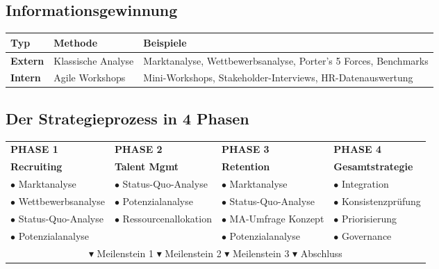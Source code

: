 \documentclass[11pt,a4paper]{article}
\begin{document}
\subsection{Informationsgewinnung}

\begin{table}[h]
\centering
\begin{tabular}{lll}
\toprule
\textbf{Typ} & \textbf{Methode} & \textbf{Beispiele} \\
\midrule
\textbf{Extern} & Klassische Analyse & Marktanalyse, Wettbewerbsanalyse, Porter's 5 Forces, Benchmarks \\
\textbf{Intern} & Agile Workshops & Mini-Workshops, Stakeholder-Interviews, HR-Datenauswertung \\
\bottomrule
\end{tabular}
\end{table}

\subsection{Der Strategieprozess in 4 Phasen}

\begin{table}[h]
\centering
\small
\begin{tabular}{p{3.2cm}p{3.2cm}p{3.2cm}p{3.2cm}}
\toprule
\textbf{PHASE 1} & \textbf{PHASE 2} & \textbf{PHASE 3} & \textbf{PHASE 4} \\
\textbf{Recruiting} & \textbf{Talent Mgmt} & \textbf{Retention} & \textbf{Gesamtstrategie} \\
\midrule
$\bullet$ Marktanalyse & $\bullet$ Status-Quo-Analyse & $\bullet$ Marktanalyse & $\bullet$ Integration \\
$\bullet$ Wettbewerbsanalyse & $\bullet$ Potenzialanalyse & $\bullet$ Status-Quo-Analyse & $\bullet$ Konsistenzprüfung \\
$\bullet$ Status-Quo-Analyse & $\bullet$ Ressourcenallokation & $\bullet$ MA-Umfrage Konzept & $\bullet$ Priorisierung \\
$\bullet$ Potenzialanalyse & & $\bullet$ Potenzialanalyse & $\bullet$ Governance \\
\midrule
\multicolumn{4}{c}{\cellcolor{trustbluelight} $\blacktriangledown$ Meilenstein 1 \hfill $\blacktriangledown$ Meilenstein 2 \hfill $\blacktriangledown$ Meilenstein 3 \hfill $\blacktriangledown$ Abschluss} \\
\bottomrule
\end{tabular}
\end{table}
\end{document}
